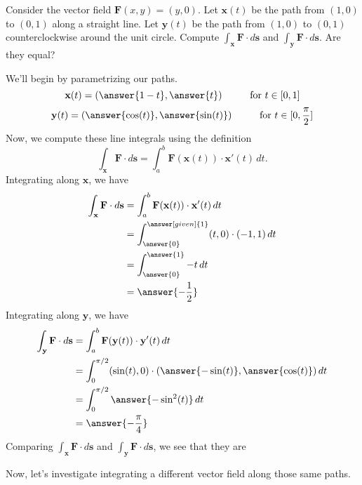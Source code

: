 \documentclass{ximera}
\begin{document}
\begin{example}
Consider the vector field $\textbf{F}(x,y) = (y,0)$. Let $\textbf{x}(t)$ be the path from $(1,0)$ to $(0,1)$ along a straight line. Let $\textbf{y}(t)$ be the path from $(1,0)$ to $(0,1)$ counterclockwise around the unit circle. Compute $\int_\textbf{x} \textbf{F}\cdot d\textbf{s}$ and $\int_\textbf{y} \textbf{F}\cdot d\textbf{s}$. Are they equal?
\begin{explanation}
We'll begin by parametrizing our paths.
\[
\textbf{x}(t)= (\answer{1-t},\answer{t})\hspace{1cm}\textrm{for }t\in[0,1]
\]
\[
\textbf{y}(t)= (\answer{\cos(t)},\answer{\sin(t)})\hspace{1cm}\textrm{for }t\in[0,\frac{\pi}{2}]
\]
Now, we compute these line integrals using the definition
\[
\int_\textbf{x} \textbf{F}\cdot d\textbf{s} = \int_a^b\textbf{F}(\textbf{x}(t))\cdot \textbf{x}'(t)\,dt.
\]
Integrating along $\textbf{x}$, we have
\begin{align*}
\int_\textbf{x} \textbf{F}\cdot d\textbf{s} &= \int_a^b\textbf{F}(\textbf{x}(t))\cdot \textbf{x}'(t)\,dt\\
&= \int_{\answer{0}}^{\answer[given]{1}}(t,0)\cdot(-1, 1)\,dt\\
&= \int_{\answer{0}}^{\answer{1}}-t\,dt\\
&= \answer{-\frac{1}{2}}
\end{align*}
Integrating along $\textbf{y}$, we have
\begin{align*}
\int_\textbf{y} \textbf{F}\cdot d\textbf{s} &= \int_a^b\textbf{F}(\textbf{y}(t))\cdot \textbf{y}'(t)\,dt\\
&= \int_{0}^{\pi/2}(\sin(t),0)\cdot({\answer{-\sin(t)}}, {\answer{\cos(t)}})\,dt\\
&= \int_{0}^{\pi/2}\answer{-\sin^2(t)}\,dt\\
&= \answer{-\frac{\pi}{4}}
\end{align*}
Comparing $\int_\textbf{x} \textbf{F}\cdot d\textbf{s}$ and $\int_\textbf{y} \textbf{F}\cdot d\textbf{s}$, we see that they are
\begin{multipleChoice}
\end{multipleChoice}
\end{explanation}
\end{example}

Now, let's investigate integrating a different vector field along those same paths.
\end{document}
